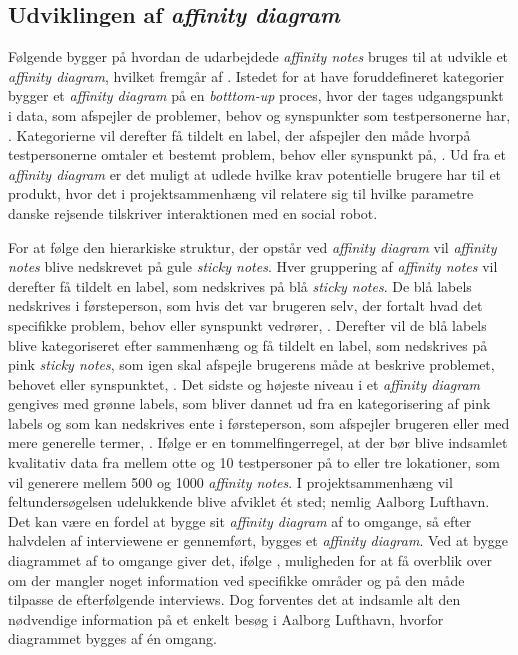 \subsection{Udviklingen af \textit{affinity diagram}}
\label{ParametreUdviklingAfAffinity}
% 
Følgende bygger på hvordan de udarbejdede \textit{affinity notes} bruges til at udvikle et \textit{affinity diagram}, hvilket fremgår af \textcite[ss. 159-179]{Book:BuildingAnAffinity}. Istedet for at have foruddefineret kategorier bygger et \textit{affinity diagram} på en \textit{botttom-up} proces, hvor der tages udgangspunkt i data, som afspejler de problemer, behov og synspunkter som testpersonerne har, \parencite[s. 159]{Book:BuildingAnAffinity}. Kategorierne vil derefter få tildelt en label, der afspejler den måde hvorpå testpersonerne omtaler et bestemt problem, behov eller synspunkt på, \parencite[s. 159]{Book:BuildingAnAffinity}. Ud fra et \textit{affinity diagram} er det muligt at udlede hvilke krav potentielle brugere har til et produkt, hvor det i projektsammenhæng vil relatere sig til hvilke parametre danske rejsende tilskriver interaktionen med en social robot. 

For at følge den hierarkiske struktur, der opstår ved \textit{affinity diagram} vil \textit{affinity notes} blive nedskrevet på gule \textit{sticky notes}. Hver gruppering af \textit{affinity notes} vil derefter få tildelt en label, som nedskrives på blå \textit{sticky notes}. De blå labels nedskrives i førsteperson, som hvis det var brugeren selv, der fortalt hvad det specifikke problem, behov eller synspunkt vedrører, \parencite[s. 160]{Book:BuildingAnAffinity}. Derefter vil de blå labels blive kategoriseret efter sammenhæng og få tildelt en label, som nedskrives på pink \textit{sticky notes}, som igen skal afspejle brugerens måde at beskrive problemet, behovet eller synspunktet, \parencite[s. 160]{Book:BuildingAnAffinity}. Det sidste og højeste niveau i et \textit{affinity diagram} gengives med grønne labels, som bliver dannet ud fra en kategorisering af pink labels og som kan nedskrives ente i førsteperson, som afspejler brugeren eller med mere generelle termer, \parencite[s. 160]{Book:BuildingAnAffinity}. \blankline
%
Ifølge \textcite[s. 161]{Book:BuildingAnAffinity} er en tommelfingerregel, at der bør blive indsamlet kvalitativ data fra mellem otte og 10 testpersoner på to eller tre lokationer, som vil generere mellem 500 og 1000 \textit{affinity notes}. I projektsammenhæng vil feltundersøgelsen udelukkende blive afviklet ét sted; nemlig Aalborg Lufthavn. Det kan være en fordel at bygge sit \textit{affinity diagram} af to omgange, så efter halvdelen af interviewene er gennemført, bygges et \textit{affinity diagram}. Ved at bygge diagrammet af to omgange giver det, ifølge \textcite[s. 162]{Book:BuildingAnAffinity}, muligheden for at få overblik over om der mangler noget information ved specifikke områder og på den måde tilpasse de efterfølgende interviews. Dog forventes det at indsamle alt den nødvendige information på et enkelt besøg i Aalborg Lufthavn, hvorfor diagrammet bygges af én omgang. 

